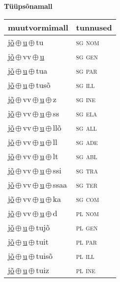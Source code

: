 

\vspace{3.5em}
\noindent \begin{minipage}{\textwidth}
\noindent \textbf{Tüüpsõnamall \,}\\

\begin{sideways}
\begin{tabular}{l l}
muutvormimall & tunnused \\
\hline
\underline{jõ}\,$\oplus$\,\underline{u}\,$\oplus$\,tu & \textsc{ sg nom } \\
\underline{jõ}\,$\oplus$\,vv\,$\oplus$\,\underline{u} & \textsc{ sg gen } \\
\underline{jõ}\,$\oplus$\,\underline{u}\,$\oplus$\,tua & \textsc{ sg par } \\
\underline{jõ}\,$\oplus$\,\underline{u}\,$\oplus$\,tusõ & \textsc{ sg ill } \\
\underline{jõ}\,$\oplus$\,vv\,$\oplus$\,\underline{u}\,$\oplus$\,z & \textsc{ sg ine } \\
\underline{jõ}\,$\oplus$\,vv\,$\oplus$\,\underline{u}\,$\oplus$\,ss & \textsc{ sg ela } \\
\underline{jõ}\,$\oplus$\,vv\,$\oplus$\,\underline{u}\,$\oplus$\,llõ & \textsc{ sg all } \\
\underline{jõ}\,$\oplus$\,vv\,$\oplus$\,\underline{u}\,$\oplus$\,ll & \textsc{ sg ade } \\
\underline{jõ}\,$\oplus$\,vv\,$\oplus$\,\underline{u}\,$\oplus$\,lt & \textsc{ sg abl } \\
\underline{jõ}\,$\oplus$\,vv\,$\oplus$\,\underline{u}\,$\oplus$\,ssi & \textsc{ sg tra } \\
\underline{jõ}\,$\oplus$\,vv\,$\oplus$\,\underline{u}\,$\oplus$\,ssaa & \textsc{ sg ter } \\
\underline{jõ}\,$\oplus$\,vv\,$\oplus$\,\underline{u}\,$\oplus$\,ka & \textsc{ sg com } \\
\underline{jõ}\,$\oplus$\,vv\,$\oplus$\,\underline{u}\,$\oplus$\,d & \textsc{ pl nom } \\
\underline{jõ}\,$\oplus$\,\underline{u}\,$\oplus$\,tujõ & \textsc{ pl gen } \\
\underline{jõ}\,$\oplus$\,\underline{u}\,$\oplus$\,tuit & \textsc{ pl par } \\
\underline{jõ}\,$\oplus$\,\underline{u}\,$\oplus$\,tuisõ & \textsc{ pl ill } \\
\underline{jõ}\,$\oplus$\,\underline{u}\,$\oplus$\,tuiz & \textsc{ pl ine } \\

\end{tabular}
\end{sideways}
\end{minipage}

